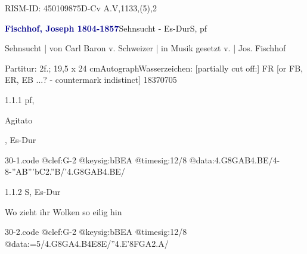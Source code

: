 \documentclass[a4paper, twocolumn, 11pt]{book}
\begin{document}
\newline %
\par RISM-ID: 450109875\newline D-Cv  A.V,1133,(5),2
\par \vspace{16pt} \textcolor{darkblue}{\textbf{Fischhof, Joseph  1804-1857}}\hfillplus{[30]}\newline Sehnsucht - Es-Dur\newline S, pf
\par \begin{itshape} Sehnsucht | von Carl Baron v. Schweizer | in Musik gesetzt v. | Jos. Fischhof\end{itshape} 
\par \textcolor{darkblue}{}  Partitur: 2f.; 19,5 x 24 cm\newline Autograph\newline Wasserzeichen: [partially cut off:] FR [or FB, ER, EB ...? - countermark indistinct]  18370705
\par 1.1.1  pf, \begin{itshape}Agitato\end{itshape}, Es-Dur  
\begin{filecontents*}{30-1.code}
@clef:G-2
@keysig:bBEA
@timesig:12/8
@data:4.G8{GAB}4.BE/4-8-{''AB'''bC}2.''B/'4.G8{GAB}4.BE/
\end{filecontents*}

\newline %
\par 1.1.2  S, Es-Dur\newline \begin{footnotesize} Wo zieht ihr Wolken so eilig hin \end{footnotesize}  
\begin{filecontents*}{30-2.code}
@clef:G-2
@keysig:bBEA
@timesig:12/8
@data:=5/4.G{8GA}4.B4E8E/''4.E'{8FGA}2.A/
\end{filecontents*}
\end{document}
